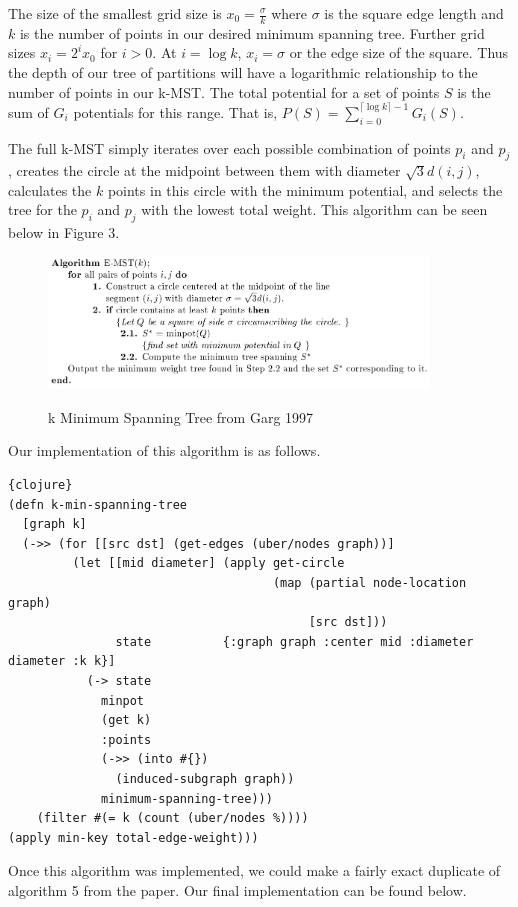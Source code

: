 \documentclass{article}
\begin{document}
The size of the smallest grid size is $x_0 = \frac{\sigma}{k}$  where $\sigma$ is the square edge length and $k$ is the number of points in our desired minimum spanning tree.
Further grid sizes $x_i = 2^ix_0$ for $i > 0$.
At $i = \log k$, $x_i = \sigma$ or the edge size of the square.
Thus the depth of our tree of partitions will have a logarithmic relationship to the number of points in our k-MST.
The total potential for a set of points $S$ is the sum of $G_i$ potentials for this range.
That is, $P(S) = \sum_{i=0}^{\lceil \log k \rceil - 1} G_i(S)$.

The full k-MST simply iterates over each possible combination of points $p_i$ and $p_j$, creates the circle at the midpoint between them with diameter $\sqrt{3}d(i,j)$, calculates the $k$ points in this circle with the minimum potential, and selects the tree for the $p_i$ and $p_j$ with the lowest total weight.
This algorithm can be seen below in Figure 3.

\begin{figure}[h]
\centering
\includegraphics[width=0.9\textwidth]{k-mst.png}
\label{k-MST}
\caption{k Minimum Spanning Tree from Garg 1997}
\end{figure}

Our implementation of this algorithm is as follows.

\begin{lstlisting}{clojure}
(defn k-min-spanning-tree
  [graph k]
  (->> (for [[src dst] (get-edges (uber/nodes graph))]
         (let [[mid diameter] (apply get-circle
                                     (map (partial node-location graph)
                                          [src dst]))
               state          {:graph graph :center mid :diameter diameter :k k}]
           (-> state
             minpot
             (get k)
             :points
             (->> (into #{})
               (induced-subgraph graph))
             minimum-spanning-tree)))
    (filter #(= k (count (uber/nodes %))))
(apply min-key total-edge-weight)))
\end{lstlisting}

Once this algorithm was implemented, we could make a fairly exact duplicate of algorithm 5 from the paper.
Our final implementation can be found below.
\end{document}
